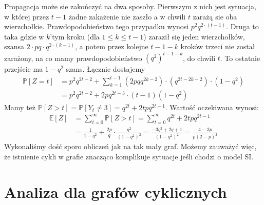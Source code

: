 Propagacja może sie zakończyć na dwa sposoby. Pierwszym z nich jest sytuacja, w której przez $t-1$ żadne zakażenie nie zaszło a w chwili $t$ zarażą sie oba wierzchołkie. Prawdopodobieństwo tego przypadku wynosi $p^2q^{2\cdot(t-1)}$. Druga to taka gdzie w $k$'tym kroku (dla $1\le k\le t-1$) zaraził się jeden wierzchołków, szansa $2\cdot pq\cdot q^{2\cdot(k-1)}$,  a potem przez kolejne $t-1-k$ kroków trzeci nie został zarażony, na co mamy prawdopodobieństwo $(q^2)^{t-1-k}$, do chwili $t$. To ostatnie przejście ma $1-q^2$ szans. Łącznie dostajemy
\begin{equation*}
\begin{aligned}
\mathbb{P}[Z=t]
&=p^2q^{2t-2}+\sum_{k=1}^{t-1} (2pqq^{2k-2})\cdot (q^{2t-2k-2}) \cdot (1-q^2) \\
&=p^2q^{2t-2}+2pq^{2t-3}\cdot(t-1)(1-q^2) 
\end{aligned}
\end{equation*}
Mamy też $\mathbb{P}[Z>t]=\mathbb{P}[Y_t\ne 3] = q^{2t}+2tpq^{2t-1}$. Wartość oczekiwana wynosi:
\begin{equation*}
\begin{aligned}
\mathbb{E}[Z]
&=\sum_{t=0}^{\infty} \mathbb{P}[Z>t]=\sum_{t=0}^{\infty} q^{2t}+2tpq^{2t-1} \\
&=\frac{1}{1-q^2}+\frac{2p}{q}\cdot \frac{q^2}{(1-q^2)^2}=\frac{-3q^2+2q+1}{(1-q^2)^2}=\frac{4-3p}{p(2-p)^2}
\end{aligned}
\end{equation*}
Wykonaliśmy dość sporo obliczeń jak na tak mały graf. Możemy zauważyć więc, że istnienie cykli w grafie znacząco komplikuje sytuacje jeśli chodzi o model SI. 

\section{Analiza dla grafów cyklicznych}

